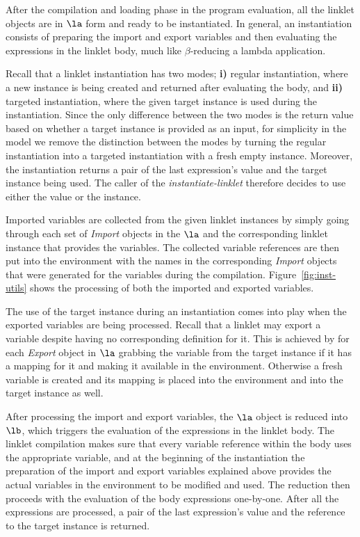 After the compilation and loading phase in the program evaluation, all
the linklet objects are in $\la$ form and ready to be instantiated. In
general, an instantiation consists of preparing the import and export
variables and then evaluating the expressions in the linklet body,
much like $\beta$-reducing a lambda application.

\onecolumn

Recall that a linklet instantiation has two modes; \textbf{i)} regular
instantiation, where a new instance is being created and returned
after evaluating the body, and \textbf{ii)} targeted instantiation,
where the given target instance is used during the
instantiation. Since the only difference between the two modes is the
return value based on whether a target instance is provided as an
input, for simplicity in the model we remove the distinction between
the modes by turning the regular instantiation into a targeted
instantiation with a fresh empty instance. Moreover, the instantiation
returns a pair of the last expression's value and the target instance
being used. The caller of the \emph{instantiate-linklet} therefore
decides to use either the value or the instance.

Imported variables are collected from the given linklet instances by
simply going through each set of \emph{Import} objects in the $\la$
and the corresponding linklet instance that provides the
variables. The collected variable references are then put into the
environment with the names in the corresponding \emph{Import} objects
that were generated for the variables during the
compilation. Figure~\ref{fig:inst-utils} shows the processing of both
the imported and exported variables.

The use of the target instance during an instantiation comes into play
when the exported variables are being processed. Recall that a linklet
may export a variable despite having no corresponding definition for
it. This is achieved by for each \emph{Export} object in $\la$
grabbing the variable from the target instance if it has a mapping for
it and making it available in the environment. Otherwise a fresh
variable is created and its mapping is placed into the environment and
into the target instance as well.

After processing the import and export variables, the $\la$ object is
reduced into $\lb$, which triggers the evaluation of the expressions
in the linklet body. The linklet compilation makes sure that every
variable reference within the body uses the appropriate variable, and
at the beginning of the instantiation the preparation of the import
and export variables explained above provides the actual variables in
the environment to be modified and used. The reduction then proceeds
with the evaluation of the body expressions one-by-one. After all the
expressions are processed, a pair of the last expression's value and
the reference to the target instance is returned.

